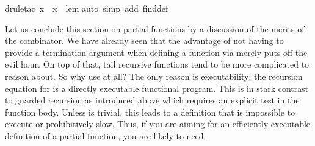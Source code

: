 \begin{isabellebody}
%
\isadelimproof
%
\endisadelimproof
%
\isatagproof
{}\isamarkupfalse%
{\isacharparenleft}drule{\isacharunderscore}tac\ x\ {\isacharequal}\ x\ \ lem{\isacharparenright}\isanewline
{}\isamarkupfalse%
{\isacharparenleft}auto\ simp\ add{\isacharcolon}\ find{}{\isacharunderscore}def{\isacharparenright}\isanewline
{}\isamarkupfalse%
%
\endisatagproof
{\isafoldproof}%
%
\isadelimproof
%
\endisadelimproof
%
\begin{isamarkuptext}%
Let us conclude this section on partial functions by a
discussion of the merits of the  combinator. We have
already seen that the advantage of not having to
provide a termination argument when defining a function via  merely puts off the evil hour. On top of that, tail recursive
functions tend to be more complicated to reason about. So why use
 at all? The only reason is executability: the recursion
equation for  is a directly executable functional
program. This is in stark contrast to guarded recursion as introduced
above which requires an explicit test  in the
function body.  Unless  is trivial, this leads to a
definition that is impossible to execute or prohibitively slow.
Thus, if you are aiming for an efficiently executable definition
of a partial function, you are likely to need .%
\end{isamarkuptext}%
\isamarkuptrue%
%
\isadelimtheory
%
\endisadelimtheory
%
\isatagtheory
\isamarkupfalse%
%
\endisatagtheory
{\isafoldtheory}%
%
\isadelimtheory
%
\endisadelimtheory
\end{isabellebody}%
